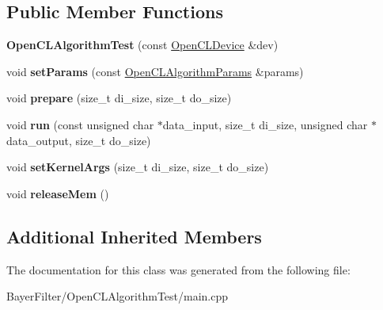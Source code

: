 \subsection*{Public Member Functions}
\begin{DoxyCompactItemize}
\item 
\hypertarget{class_set_device_1_1_open_c_l_algorithm_test_ab5f3f597118f26ec57bfcc68470d0b67}{{\bfseries Open\-C\-L\-Algorithm\-Test} (const \hyperlink{class_open_c_l_device}{Open\-C\-L\-Device} \&dev)}\label{class_set_device_1_1_open_c_l_algorithm_test_ab5f3f597118f26ec57bfcc68470d0b67}

\item 
\hypertarget{class_set_device_1_1_open_c_l_algorithm_test_a6c107801289a2a47763eeb68270c1409}{void {\bfseries set\-Params} (const \hyperlink{class_open_c_l_algorithm_params}{Open\-C\-L\-Algorithm\-Params} \&params)}\label{class_set_device_1_1_open_c_l_algorithm_test_a6c107801289a2a47763eeb68270c1409}

\item 
\hypertarget{class_set_device_1_1_open_c_l_algorithm_test_ad52d21b6b65b71ae40d526003d1f6873}{void {\bfseries prepare} (size\-\_\-t di\-\_\-size, size\-\_\-t do\-\_\-size)}\label{class_set_device_1_1_open_c_l_algorithm_test_ad52d21b6b65b71ae40d526003d1f6873}

\item 
\hypertarget{class_set_device_1_1_open_c_l_algorithm_test_a1b3aaf5b744fd41318cc71869028dec2}{void {\bfseries run} (const unsigned char $\ast$data\-\_\-input, size\-\_\-t di\-\_\-size, unsigned char $\ast$data\-\_\-output, size\-\_\-t do\-\_\-size)}\label{class_set_device_1_1_open_c_l_algorithm_test_a1b3aaf5b744fd41318cc71869028dec2}

\item 
\hypertarget{class_set_device_1_1_open_c_l_algorithm_test_a024339d9853d773c29e66ed766784856}{void {\bfseries set\-Kernel\-Args} (size\-\_\-t di\-\_\-size, size\-\_\-t do\-\_\-size)}\label{class_set_device_1_1_open_c_l_algorithm_test_a024339d9853d773c29e66ed766784856}

\item 
\hypertarget{class_set_device_1_1_open_c_l_algorithm_test_af9fe4a5fdbb0cf7bb09580bc388d864b}{void {\bfseries release\-Mem} ()}\label{class_set_device_1_1_open_c_l_algorithm_test_af9fe4a5fdbb0cf7bb09580bc388d864b}

\end{DoxyCompactItemize}
\subsection*{Additional Inherited Members}


The documentation for this class was generated from the following file\-:\begin{DoxyCompactItemize}
\item 
Bayer\-Filter/\-Open\-C\-L\-Algorithm\-Test/main.\-cpp\end{DoxyCompactItemize}
